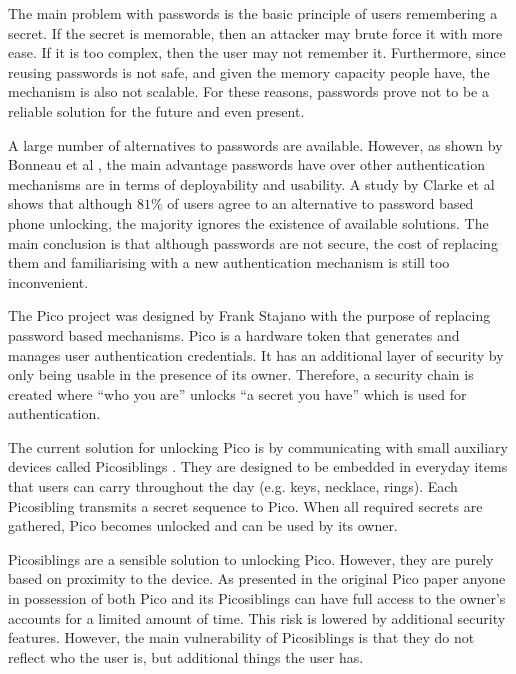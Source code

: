 The main problem with passwords is the basic principle of users remembering a secret. If the secret is memorable, then an attacker may brute force it with more ease. If it is too complex, then the user may not remember it. Furthermore, since reusing passwords is not safe, and given the memory capacity people have, the mechanism is also not scalable. For these reasons, passwords prove not to be a reliable solution for the future and even present.

A large number of alternatives to passwords are available. However, as shown by Bonneau et al \cite{bonneau2012quest}, the main advantage passwords have over other authentication mechanisms are in terms of deployability and usability. A study by Clarke et al \cite{clarke2002acceptance} shows that although $81\%$ of users agree to an alternative to password based phone unlocking, the majority ignores the existence of available solutions. The main conclusion is that although passwords are not secure, the cost of replacing them and familiarising with a new authentication mechanism is still too inconvenient. 

The Pico project was designed by Frank Stajano \cite{stajano2011pico} with the purpose of replacing password based mechanisms. Pico is a hardware token that generates and manages user authentication credentials. It has an additional layer of security by only being usable in the presence of its owner. Therefore, a security chain is created where ``who you are'' unlocks ``a secret you have'' which is used for authentication.

The current solution for unlocking Pico is by communicating with small auxiliary devices called Picosiblings \cite{stannard2012good}. They are designed to be embedded in everyday items that users can carry throughout the day (e.g. keys, necklace, rings). Each Picosibling transmits a secret sequence to Pico. When all required secrets are gathered, Pico becomes unlocked and can be used by its owner.

Picosiblings are a sensible solution to unlocking Pico. However, they are purely based on proximity to the device. As presented in the original Pico paper \cite{stajano2011pico} anyone in possession of both Pico and its Picosiblings can have full access to the owner's accounts for a limited amount of time. This risk is lowered by additional security features. However, the main vulnerability of Picosiblings is that they do not reflect who the user is, but additional things the user has.

